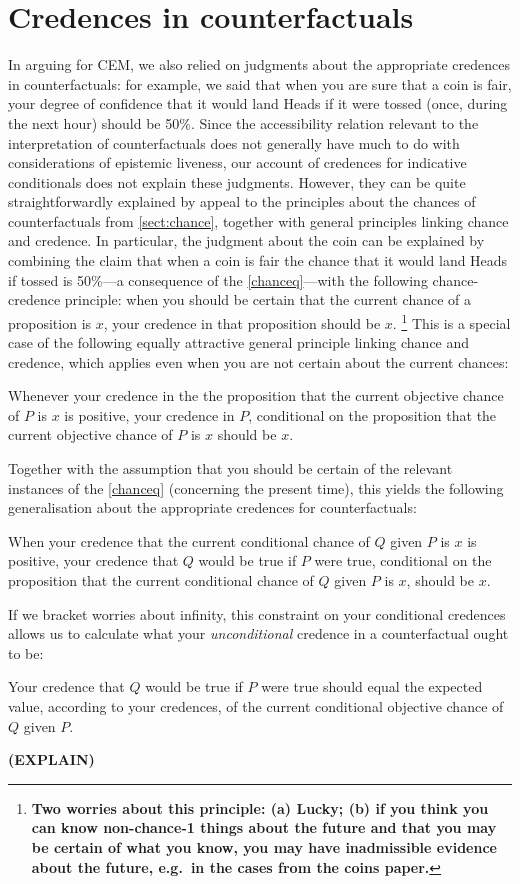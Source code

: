 \documentclass[If.tex]{subfiles}
\begin{document}
\section{Credences in counterfactuals}\label{sect:cfcredence}
In arguing for CEM, we also relied on judgments about the appropriate credences in counterfactuals: for example, we said that when you are sure that a coin is fair, your degree of confidence that it would land Heads if it were tossed (once, during the next hour) should be 50\%.  Since the accessibility relation relevant to the interpretation of counterfactuals does not generally have much to do with considerations of epistemic liveness, our account of credences for indicative conditionals does not explain these judgments.  However, they can be quite straightforwardly explained by appeal to the principles about the chances of counterfactuals from \autoref{sect:chance}, together with general principles linking chance and credence.  In particular, the judgment about the coin can be explained by combining the claim that when a coin is fair the chance that it would land Heads if tossed is 50\%---a consequence of the \ref{chanceq}---with the following chance-credence principle: when you should be certain that the current chance of a proposition is $x$, your credence in that proposition should be $x$.%
\footnote{\textbf{Two worries about this principle: (a) Lucky; (b) if you think you can know non-chance-1 things about the future and that you may be certain of what you know, you may have inadmissible evidence about the future, e.g.~in the cases from the coins paper.}} 
This is a special case of the following equally attractive general principle linking chance and credence, which applies even when you are not certain about the current chances:
\begin{prop}
	 \label{currentpp}
	Whenever your credence in the the proposition that the current objective chance of $P$ is $x$ is positive, your credence in $P$, conditional on the proposition that the current objective chance of $P$ is $x$ should be $x$.
\end{prop}
Together with the assumption that you should be certain of the relevant
instances of the \ref{chanceq} (concerning the present time), this
yields the following generalisation about the appropriate credences for
counterfactuals:
\begin{prop}
	 \label{currentskyrms}
	When your credence that the current conditional chance of $Q$ given $P$ is $x$ is positive, your credence that $Q$ would be true if $P$ were true, conditional on the proposition that the current conditional chance of $Q$ given $P$ is $x$, should be $x$. 
\end{prop}
If we bracket worries about infinity, this constraint on your
conditional credences allows us to calculate what your
\emph{unconditional} credence in a counterfactual ought to be:
\begin{prop}
	\item
	Your credence that $Q$ would be true if $P$ were true should equal the expected value, according to your credences, of the current conditional objective chance of $Q$ given $P$.
\end{prop}
\textbf{(EXPLAIN)}
\end{document}
